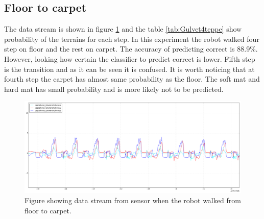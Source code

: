 \documentclass[USenglish]{ifimaster}  %
\begin{document}
	
	\clearpage
\subsection{Floor to carpet}
The data stream is shown in figure \ref{fig:gulvet4teppegraf} and the table \ref{tab:Gulvet4teppe} show probability of the terrains for each step. In this experiment the robot walked four step on floor and the rest on carpet. The accuracy of predicting correct is 88.9\%. However, looking how certain the classifier to predict correct is lower. Fifth step is the transition and as it can be seen it is confused. It is worth noticing that at fourth step the carpet has almost same probability as the floor. The soft mat and hard mat has small probability and is more likely not to be predicted.
	
	\begin{figure}[h]
		\centering
		\includegraphics[width=\textwidth,height=\textheight,keepaspectratio]{Figures/Gulvet4Teppe2}
		\caption{Figure showing data stream from sensor when the robot walked from floor to carpet.}
		\label{fig:gulvet4teppegraf}
	\end{figure}
	
	
	\begin{table}[h]
		\centering
		\caption{The table showing probability of each terrain per step from floor to carpet. Marked green represent correct prediction and correct terrain, red represent wrong prediction and yellow is the correct prediction if it got wrong.}
		\label{tab:Gulvet4teppe}
	\end{table}
	\FloatBarrier
	
\end{document}
